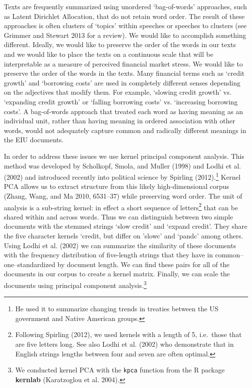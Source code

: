 \documentclass[]{article}
\let\rmarkdownfootnote\footnote%
\def\footnote{\protect\rmarkdownfootnote}
\begin{document}
Texts are frequently summarized using unordered `bag-of-words'
approaches, such as Latent Dirichlet Allocation, that do not retain word
order. The result of these approaches is often clusters of `topics'
within speeches or speeches to clusters (see Grimmer and Stewart 2013
for a review). We would like to accomplish something different. Ideally,
we would like to preserve the order of the words in our texts and we
would like to place the texts on a continuous scale that will be
interpretable as a measure of perceived financial market stress. We
would like to preserve the order of the words in the texts. Many
financial terms such as `credit growth' and `borrowing costs' are used
in completely different senses depending on the adjectives that modify
them. For example, `slowing credit growth' vs. `expanding credit growth'
or `falling borrowing costs' vs. `increasing borrowing costs'. A
bag-of-words approach that treated each word as having meaning as an
individual unit, rather than having meaning in ordered association with
other words, would not adequately capture common and radically different
meanings in the EIU documents.

In order to address these issues we use kernel principal component
analysis. This method was developed by Scholkopf, Smola, and Muller
(1998) and Lodhi et al. (2002) and introduced recently into political
science by Spirling (2012).\footnote{He used it to summarize changing
  trends in treaties between the US government and Native American
  groups.} Kernel PCA allows us to extract structure from this likely
high-dimensional corpus (Zhang, Wang, and Ma 2010, 6531--37) while
preserving word order. The unit of analysis is a sub-string kernel: in
effect a short sequence of letters\footnote{Following Spirling (2012),
  we used kernels with a length of 5, i.e.~those that are five letters
  long. See also Lodhi et al. (2002) who demonstrate that in English
  strings lengths between four and seven are often optimal.} that can be
shared within and across words. Thus we can distinguish between two
simple documents with the stemmed strings `slow credit' and `expand
credit'. They share the five character kernels `credit, but differ on
'slowc' and `pandc' among others. Using Lodhi et al. (2002) we can
summarize the similarity of these documents with the frequency
distribution of five-length strings that they have in
common--one--standardized by document length. We can find these pairs
for all of the documents in our corpus to create a kernel matrix.
Finally, we can scale the documents using principal component
analysis.\footnote{We conducted kernel PCA with the \texttt{kpca}
  function from the R package \textbf{kernlab} (Karatzoglou et al.
  2004).}
\end{document}
